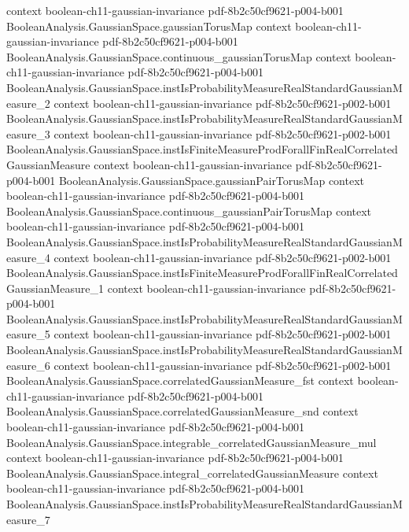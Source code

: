 \begin{theorem}
  {context}
  {boolean-ch11-gaussian-invariance}
  {pdf-8b2c50cf9621-p004-b001}
\proofstep
  {BooleanAnalysis.GaussianSpace.gaussianTorusMap}
  {context}
  {boolean-ch11-gaussian-invariance}
  {pdf-8b2c50cf9621-p004-b001}
\proofstep
  {BooleanAnalysis.GaussianSpace.continuous_gaussianTorusMap}
  {context}
  {boolean-ch11-gaussian-invariance}
  {pdf-8b2c50cf9621-p004-b001}
\proofstep
  {BooleanAnalysis.GaussianSpace.instIsProbabilityMeasureRealStandardGaussianMeasure_2}
  {context}
  {boolean-ch11-gaussian-invariance}
  {pdf-8b2c50cf9621-p002-b001}
\proofstep
  {BooleanAnalysis.GaussianSpace.instIsProbabilityMeasureRealStandardGaussianMeasure_3}
  {context}
  {boolean-ch11-gaussian-invariance}
  {pdf-8b2c50cf9621-p002-b001}
\proofstep
  {BooleanAnalysis.GaussianSpace.instIsFiniteMeasureProdForallFinRealCorrelatedGaussianMeasure}
  {context}
  {boolean-ch11-gaussian-invariance}
  {pdf-8b2c50cf9621-p004-b001}
\proofstep
  {BooleanAnalysis.GaussianSpace.gaussianPairTorusMap}
  {context}
  {boolean-ch11-gaussian-invariance}
  {pdf-8b2c50cf9621-p004-b001}
\proofstep
  {BooleanAnalysis.GaussianSpace.continuous_gaussianPairTorusMap}
  {context}
  {boolean-ch11-gaussian-invariance}
  {pdf-8b2c50cf9621-p004-b001}
\proofstep
  {BooleanAnalysis.GaussianSpace.instIsProbabilityMeasureRealStandardGaussianMeasure_4}
  {context}
  {boolean-ch11-gaussian-invariance}
  {pdf-8b2c50cf9621-p002-b001}
\proofstep
  {BooleanAnalysis.GaussianSpace.instIsFiniteMeasureProdForallFinRealCorrelatedGaussianMeasure_1}
  {context}
  {boolean-ch11-gaussian-invariance}
  {pdf-8b2c50cf9621-p004-b001}
\proofstep
  {BooleanAnalysis.GaussianSpace.instIsProbabilityMeasureRealStandardGaussianMeasure_5}
  {context}
  {boolean-ch11-gaussian-invariance}
  {pdf-8b2c50cf9621-p002-b001}
\proofstep
  {BooleanAnalysis.GaussianSpace.instIsProbabilityMeasureRealStandardGaussianMeasure_6}
  {context}
  {boolean-ch11-gaussian-invariance}
  {pdf-8b2c50cf9621-p002-b001}
\proofstep
  {BooleanAnalysis.GaussianSpace.correlatedGaussianMeasure_fst}
  {context}
  {boolean-ch11-gaussian-invariance}
  {pdf-8b2c50cf9621-p004-b001}
\proofstep
  {BooleanAnalysis.GaussianSpace.correlatedGaussianMeasure_snd}
  {context}
  {boolean-ch11-gaussian-invariance}
  {pdf-8b2c50cf9621-p004-b001}
\proofstep
  {BooleanAnalysis.GaussianSpace.integrable_correlatedGaussianMeasure_mul}
  {context}
  {boolean-ch11-gaussian-invariance}
  {pdf-8b2c50cf9621-p004-b001}
\proofstep
  {BooleanAnalysis.GaussianSpace.integral_correlatedGaussianMeasure}
  {context}
  {boolean-ch11-gaussian-invariance}
  {pdf-8b2c50cf9621-p004-b001}
\proofstep
  {BooleanAnalysis.GaussianSpace.instIsProbabilityMeasureRealStandardGaussianMeasure_7}

\end{theorem}
